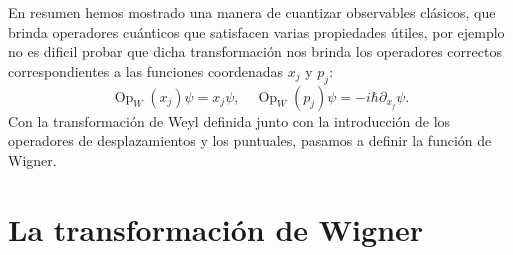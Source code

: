 \documentclass[a4paper]{report}
\DeclareMathOperator{\Op}{Op}
\begin{document}
  En resumen hemos mostrado una manera de cuantizar
  observables clásicos, que brinda operadores cuánticos que
  satisfacen varias propiedades útiles, por ejemplo no es
  dificil probar que dicha transformación nos brinda los
  operadores correctos correspondientes a las funciones
  coordenadas
  $x_j$ y $p_j$:
  \begin{equation}
    \Op_W(x_j)\psi = x_j\psi,
    \quad
    \Op_W(p_j)\psi = -i\hbar \partial_{x_j}\psi.
  \end{equation}
  Con la transformación de Weyl definida junto con la
  introducción de los operadores de desplazamientos y los
  puntuales, pasamos a definir la función de Wigner.

  \section{La transformación de Wigner}
\end{document}
